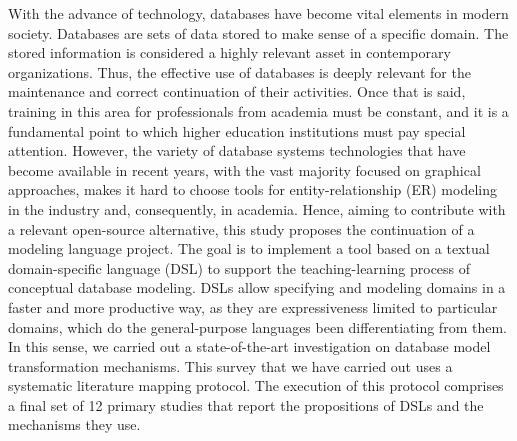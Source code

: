 \begin{resumo}[Abstract]
With the advance of technology, databases have become vital elements in modern society.
Databases are sets of data stored to make sense of a specific domain.
The stored information is considered a highly relevant asset in contemporary organizations.
Thus, the effective use of databases is deeply relevant for the maintenance and correct continuation of their activities.
Once that is said, training in this area for professionals from academia must be constant, and it is a fundamental point to which higher education institutions must pay special attention.
However, the variety of database systems technologies that have become available in recent years, with the vast majority focused on graphical approaches, makes it hard to choose tools for entity-relationship (ER) modeling in the industry and, consequently, in academia.
Hence, aiming to contribute with a relevant open-source alternative, this study proposes the continuation of a modeling language project.
The goal is to implement a tool based on a textual domain-specific language (DSL) to support the teaching-learning process of conceptual database modeling.
DSLs allow specifying and modeling domains in a faster and more productive way, as they are expressiveness limited to particular domains, which do the general-purpose languages been differentiating from them.
In this sense, we carried out a state-of-the-art investigation on database model transformation mechanisms.
This survey that we have carried out uses a systematic literature mapping protocol.
The execution of this protocol comprises a final set of 12 primary studies that report the propositions of DSLs and the mechanisms they use.

\end{resumo}
